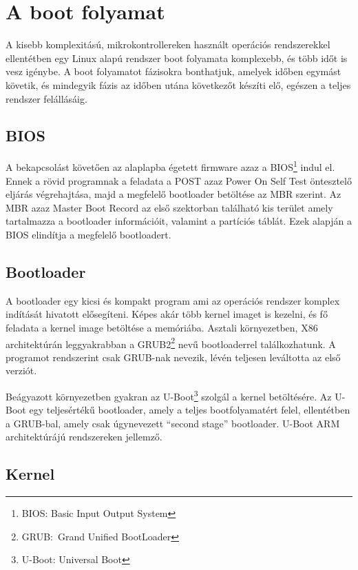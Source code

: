 \section{A boot folyamat}

A kisebb komplexitású, mikrokontrollereken használt operációs rendszerekkel
ellentétben egy Linux alapú rendszer boot folyamata komplexebb, és több időt is
vesz igénybe. A boot folyamatot fázisokra bonthatjuk, amelyek időben egymást
követik, és mindegyik fázis az időben utána következőt készíti elő, egészen a
teljes rendszer felállásáig.

\subsection{BIOS}

A bekapcsolást követően az alaplapba égetett firmware azaz a BIOS\footnote{BIOS:
Basic Input Output System} indul el. Ennek a rövid programnak a feladata a POST
azaz Power On Self Test öntesztelő eljárás végrehajtása, majd a megfelelő
bootloader betöltése az MBR szerint. Az MBR azaz Master Boot Record az első
szektorban található kis terület amely tartalmazza a bootloader információit,
valamint a partíciós táblát. Ezek alapján a BIOS elindítja a megfelelő
bootloadert.

\subsection{Bootloader}

A bootloader egy kicsi és kompakt program ami az operációs rendszer komplex
indítását hivatott elősegíteni. Képes akár több kernel imaget is kezelni, és fő
feladata a kernel image betöltése a memóriába. Asztali környezetben, X86
architektúrán leggyakrabban a GRUB2\footnote{GRUB:~Grand Unified BootLoader} nevű
bootloaderrel találkozhatunk. A programot rendszerint csak GRUB-nak nevezik,
lévén teljesen leváltotta az első verziót.

Beágyazott környezetben gyakran az U-Boot\footnote{U-Boot: Universal Boot}
szolgál a kernel betöltésére. Az U-Boot egy teljesértékű bootloader, amely a
teljes bootfolyamatért felel, ellentétben a GRUB-bal, amely csak úgynevezett
``second stage'' bootloader. U-Boot ARM architektúrájú rendszereken jellemző.

\subsection{Kernel}

